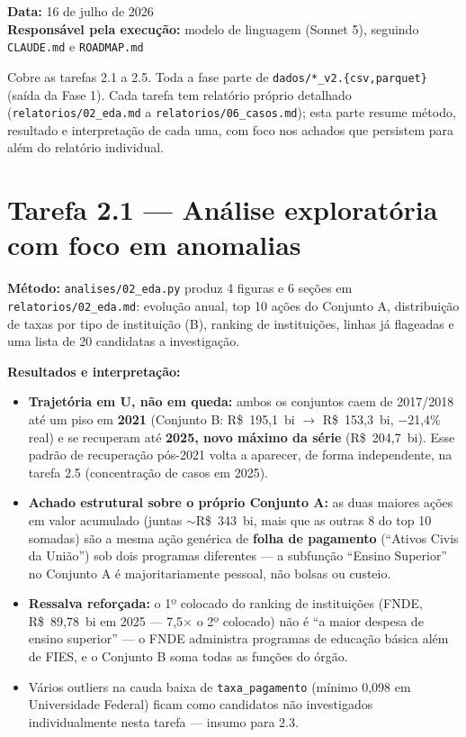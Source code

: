\documentclass[11pt,a4paper]{article}
\begin{document}
\noindent\textbf{Data:} 16 de julho de 2026 \\
\textbf{Responsável pela execução:} modelo de linguagem (Sonnet 5), seguindo \texttt{CLAUDE.md} e \texttt{ROADMAP.md}

\bigskip
\noindent Cobre as tarefas 2.1 a 2.5. Toda a fase parte de
\texttt{dados/*\_v2.\{csv,parquet\}} (saída da Fase 1). Cada tarefa tem
relatório próprio detalhado (\texttt{relatorios/02\_eda.md} a
\texttt{relatorios/06\_casos.md}); esta parte resume método, resultado e
interpretação de cada uma, com foco nos achados que persistem para além do
relatório individual.

\section{Tarefa 2.1 --- Análise exploratória com foco em anomalias}

\textbf{Método:} \texttt{analises/02\_eda.py} produz 4 figuras e 6 seções
em \texttt{relatorios/02\_eda.md}: evolução anual, top 10 ações do
Conjunto A, distribuição de taxas por tipo de instituição (B), ranking de
instituições, linhas já flageadas e uma lista de 20 candidatas a
investigação.

\textbf{Resultados e interpretação:}

\begin{itemize}
    \item \textbf{Trajetória em U, não em queda:} ambos os conjuntos caem
    de 2017/2018 até um piso em \textbf{2021} (Conjunto B: R\$~195,1~bi
    $\to$ R\$~153,3~bi, $-$21,4\% real) e se recuperam até \textbf{2025,
    novo máximo da série} (R\$~204,7~bi). Esse padrão de recuperação
    pós-2021 volta a aparecer, de forma independente, na tarefa 2.5
    (concentração de casos em 2025).
    \item \textbf{Achado estrutural sobre o próprio Conjunto A:} as duas
    maiores ações em valor acumulado (juntas ${\sim}$R\$~343~bi, mais que
    as outras 8 do top 10 somadas) são a mesma ação genérica de
    \textbf{folha de pagamento} (``Ativos Civis da União'') sob dois
    programas diferentes --- a subfunção ``Ensino Superior'' no Conjunto A
    é majoritariamente pessoal, não bolsas ou custeio.
    \item \textbf{Ressalva reforçada:} o 1º colocado do ranking de
    instituições (FNDE, R\$~89,78~bi em 2025 --- 7,5$\times$ o 2º
    colocado) não é ``a maior despesa de ensino superior'' --- o FNDE
    administra programas de educação básica além de FIES, e o Conjunto B
    soma todas as funções do órgão.
    \item Vários outliers na cauda baixa de \texttt{taxa\_pagamento}
    (mínimo 0,098 em Universidade Federal) ficam como candidatos não
    investigados individualmente nesta tarefa --- insumo para 2.3.
\end{itemize}
\end{document}
